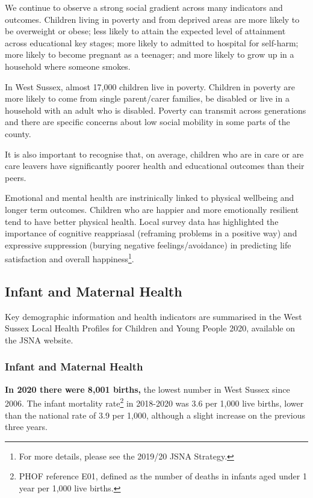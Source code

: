 We continue to observe a strong social gradient across many indicators and outcomes. Children living in poverty and from deprived areas are more likely to be overweight or obese; less likely to attain the expected level of attainment across educational key stages; more likely to admitted to hospital for self-harm; more likely to become pregnant as a teenager; and more likely to grow up in a household where someone smokes. 

In West Sussex, almost 17,000 children live in poverty. Children in poverty are more likely to come from single parent/carer families, be disabled or live in a household with an adult who is disabled. Poverty can transmit across generations and there are specific concerns about low social mobility in some parts of the county. 

It is also important to recognise that, on average, children who are in care or are care leavers have significantly poorer health and educational outcomes than their peers. 

Emotional and mental health are instrinically linked to physical wellbeing and longer term outcomes. Children who are happier and more emotionally resilient tend to have better physical health. Local survey data has highlighted the importance of cognitive reappriasal (reframing problems in a positive way) and expressive suppression (burying negative feelings/avoidance) in predicting life satisfaction and overall happiness\footnote{For more details, please see the 2019/20 JSNA Strategy.}.



\subsection{Infant and Maternal Health}
Key demographic information and health indicators are summarised in the West Sussex Local Health Profiles for Children and Young People 2020, available on the JSNA website.

\subsubsection{Infant and Maternal Health}
{\bfseries In 2020 there were 8,001 births,} the lowest number in West Sussex since 2006. The infant mortality rate\footnote{PHOF reference E01, defined as the number of deaths in infants aged under 1 year per 1,000 live births.} in 2018-2020 was 3.6 per 1,000 live births, lower than the national rate of 3.9 per 1,000, although a slight increase on the previous three years.

